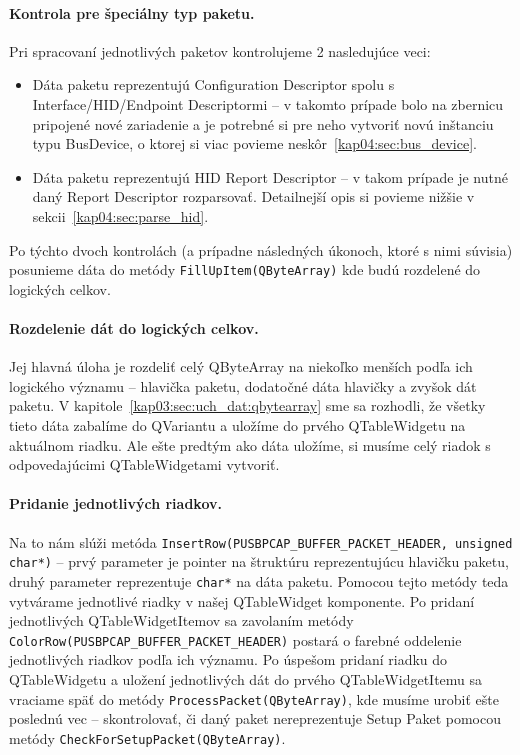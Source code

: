 \paragraph{Kontrola pre špeciálny typ paketu.}
\hfill \break
Pri spracovaní jednotlivých paketov kontrolujeme 2 nasledujúce veci:
\begin{itemize}
\item Dáta paketu reprezentujú Configuration Descriptor spolu s Interface/HID/\newline Endpoint Descriptormi -- v takomto prípade bolo na zbernicu pripojené nové zariadenie a je potrebné si pre neho vytvoriť novú inštanciu typu BusDevice, o ktorej si viac povieme neskôr~\ref{kap04:sec:bus_device}.
\item Dáta paketu reprezentujú HID Report Descriptor -- v takom prípade je nutné daný Report Descriptor rozparsovať. Detailnejší opis si povieme nižšie v sekcii~\ref{kap04:sec:parse_hid}.
\end{itemize}
Po týchto dvoch kontrolách (a prípadne následných úkonoch, ktoré s nimi súvisia) posunieme dáta do metódy \texttt{FillUpItem(QByteArray)} kde budú rozdelené do logických celkov.  

\paragraph{Rozdelenie dát do logických celkov.}
\hfill \break
Jej hlavná úloha je rozdeliť celý QByteArray na niekoľko menších podľa ich logického významu -- hlavička paketu, dodatočné dáta hlavičky a zvyšok dát paketu. V kapitole~\ref{kap03:sec:uch_dat:qbytearray} sme sa rozhodli, že všetky tieto dáta zabalíme do QVariantu a uložíme do prvého QTableWidgetu na aktuálnom riadku. Ale ešte predtým ako dáta uložíme, si musíme celý riadok s odpovedajúcimi QTableWidgetami vytvoriť.

\paragraph{Pridanie jednotlivých riadkov.}
\hfill \break
Na to nám slúži metóda \texttt{InsertRow(PUSBPCAP\_BUFFER\_PACKET\_HEADER, \newline unsigned char*)} -- prvý parameter je pointer na štruktúru reprezentujúcu hlavičku paketu, druhý parameter reprezentuje \texttt{char*} na dáta paketu. Pomocou tejto metódy teda vytvárame jednotlivé riadky v našej QTableWidget komponente. Po pridaní jednotlivých QTableWidgetItemov sa zavolaním metódy \newline\texttt{ColorRow(PUSBPCAP\_BUFFER\_PACKET\_HEADER)} postará o farebné oddelenie jednotlivých riadkov podľa ich významu. Po úspešom pridaní riadku do QTableWidgetu a uložení jednotlivých dát do prvého QTableWidgetItemu sa vraciame späť do metódy \texttt{ProcessPacket(QByteArray)}, kde musíme urobiť ešte poslednú vec -- skontrolovať, či daný paket nereprezentuje Setup Paket pomocou metódy \texttt{CheckForSetupPacket(QByteArray)}. 

